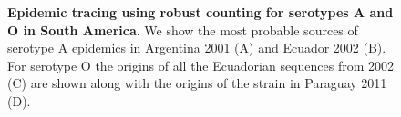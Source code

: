 \documentclass[10pt]{article}
\begin{document}
\begin{figure}[!ht]
\begin{center}
\end{center}
\caption{\textbf{Epidemic tracing using robust counting for serotypes A and O in South America}.
We show the most probable sources of serotype A epidemics in Argentina 2001 (A) and Ecuador 2002 (B).
For serotype O the origins of all the Ecuadorian sequences from 2002 (C) are shown along with the origins of the strain in Paraguay 2011 (D).
}
\label{fig:epidemictracing}
\end{figure}
\end{document}
